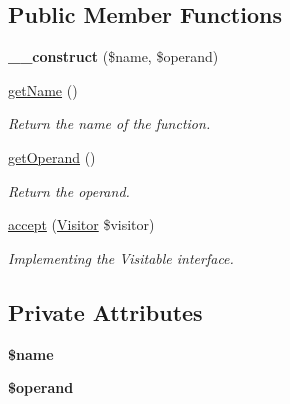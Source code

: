 \subsection*{Public Member Functions}
\begin{DoxyCompactItemize}
\item 
\hypertarget{classMathParser_1_1Parsing_1_1Nodes_1_1FunctionNode_a1e5f029d0dbac72b28d6d42048140b3b}{{\bfseries \-\_\-\-\_\-construct} (\$name, \$operand)}\label{classMathParser_1_1Parsing_1_1Nodes_1_1FunctionNode_a1e5f029d0dbac72b28d6d42048140b3b}

\item 
\hyperlink{classMathParser_1_1Parsing_1_1Nodes_1_1FunctionNode_a797c638dc3ef116100b5db449e7fb231}{get\-Name} ()
\begin{DoxyCompactList}\small\item\em Return the name of the function. \end{DoxyCompactList}\item 
\hyperlink{classMathParser_1_1Parsing_1_1Nodes_1_1FunctionNode_acea27b2dadadaa202ddefb69fb3a2cdf}{get\-Operand} ()
\begin{DoxyCompactList}\small\item\em Return the operand. \end{DoxyCompactList}\item 
\hypertarget{classMathParser_1_1Parsing_1_1Nodes_1_1FunctionNode_a9796a0fdaf49525adc9ea539b4291835}{\hyperlink{classMathParser_1_1Parsing_1_1Nodes_1_1FunctionNode_a9796a0fdaf49525adc9ea539b4291835}{accept} (\hyperlink{interfaceMathParser_1_1Interpreting_1_1Visitors_1_1Visitor}{Visitor} \$visitor)}\label{classMathParser_1_1Parsing_1_1Nodes_1_1FunctionNode_a9796a0fdaf49525adc9ea539b4291835}

\begin{DoxyCompactList}\small\item\em Implementing the Visitable interface. \end{DoxyCompactList}\end{DoxyCompactItemize}
\subsection*{Private Attributes}
\begin{DoxyCompactItemize}
\item 
\hypertarget{classMathParser_1_1Parsing_1_1Nodes_1_1FunctionNode_abc812043d66ed2e415f6cb79bb596be3}{{\bfseries \$name}}\label{classMathParser_1_1Parsing_1_1Nodes_1_1FunctionNode_abc812043d66ed2e415f6cb79bb596be3}

\item 
\hypertarget{classMathParser_1_1Parsing_1_1Nodes_1_1FunctionNode_aef940f5b536e7e370eef241088522331}{{\bfseries \$operand}}\label{classMathParser_1_1Parsing_1_1Nodes_1_1FunctionNode_aef940f5b536e7e370eef241088522331}

\end{DoxyCompactItemize}
